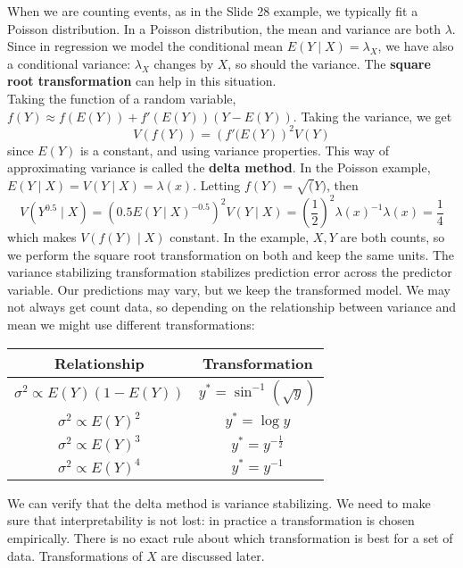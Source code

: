 \documentclass[12pt, a4paper]{article}
\theoremstyle{definition}
\newcommand{\f}{\frac}
\newcommand{\BB}[1]{\left(#1\right)}
\begin{document}
  	When we are counting events, as in the Slide 28 example, we typically fit a Poisson distribution. In a Poisson distribution, the mean and variance are both $\lambda$. Since in regression we model the conditional mean $E(Y \mid X) = \lambda_X$, we have also a conditional variance: $\lambda_X$ changes by $X$, so should the variance. The {\bf square root transformation} can help in this situation.\\
  	
  	Taking the function of a random variable, $f(Y) \approx f(E(Y)) + f'(E(Y))(Y-E(Y))$. Taking the variance, we get
  	$$
  		V(f(Y)) = \BB{f'(E(Y)}^2V(Y)
  	$$
  	since $E(Y)$ is a constant, and using variance properties. This way of approximating variance is called the {\bf delta method}. In the Poisson example, $E(Y \mid X) = V(Y \mid X) = \lambda(x)$. Letting $f(Y) = \sqrt(Y)$, then
  	$$
  		V(Y^{0.5} \mid X) = \BB{0.5 E(Y \mid X)^{-0.5}}^2V(Y \mid X) = \BB{\f12}^2 \lambda(x)^{-1} \lambda(x) = \f14
  	$$
  	which makes $V(f(Y) \mid X)$ constant. In the example, $X,Y$ are both counts, so we perform the square root transformation on both and keep the same units. The variance stabilizing transformation stabilizes prediction error across the predictor variable. Our predictions may vary, but we keep the transformed model. We may not always get count data, so depending on the relationship between variance and mean we might use different transformations:
  	
  	\begin{center}
  		\begin{tabular}{ c c }
  			\hline
  			Relationship & Transformation \\
  			\hline
  			$\sigma^2 \propto E(Y)(1-E(Y))$ & $y^* = \sin^{-1}(\sqrt{y})$ \\
  			$\sigma^2 \propto E(Y)^2$ & $y^* = \log y$ \\ 
  			$\sigma^2 \propto E(Y)^3$ & $y^* = y^{-\f12}$ \\
  			$\sigma^2 \propto E(Y)^4$ & $y^* = y^{-1}$ \\
  			\hline
  		\end{tabular}
  	\end{center}
  	
  	We can verify that the delta method is variance stabilizing. We need to make sure that interpretability is not lost: in practice a transformation is chosen empirically. There is no exact rule about which transformation is best for a set of data. Transformations of $X$ are discussed later.
  	
\end{document}
